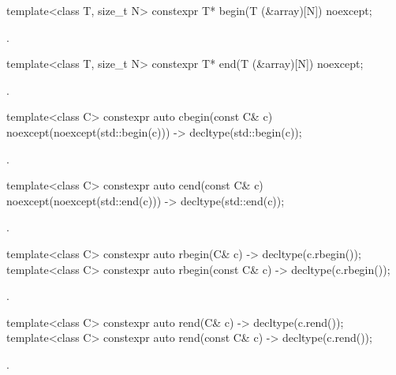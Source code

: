 %
\begin{itemdecl}
template<class T, size_t N> constexpr T* begin(T (&array)[N]) noexcept;
\end{itemdecl}

\begin{itemdescr}
\pnum
\returns
{}.
\end{itemdescr}

%
\begin{itemdecl}
template<class T, size_t N> constexpr T* end(T (&array)[N]) noexcept;
\end{itemdecl}

\begin{itemdescr}
\pnum
\returns
{}.
\end{itemdescr}

%
\begin{itemdecl}
template<class C> constexpr auto cbegin(const C& c) noexcept(noexcept(std::begin(c)))
  -> decltype(std::begin(c));
\end{itemdecl}
\begin{itemdescr}
\pnum
\returns
{}.
\end{itemdescr}

%
\begin{itemdecl}
template<class C> constexpr auto cend(const C& c) noexcept(noexcept(std::end(c)))
  -> decltype(std::end(c));
\end{itemdecl}
\begin{itemdescr}
\pnum
\returns
{}.
\end{itemdescr}

%
\begin{itemdecl}
template<class C> constexpr auto rbegin(C& c) -> decltype(c.rbegin());
template<class C> constexpr auto rbegin(const C& c) -> decltype(c.rbegin());
\end{itemdecl}
\begin{itemdescr}
\pnum
\returns
{}.
\end{itemdescr}

%
\begin{itemdecl}
template<class C> constexpr auto rend(C& c) -> decltype(c.rend());
template<class C> constexpr auto rend(const C& c) -> decltype(c.rend());
\end{itemdecl}
\begin{itemdescr}
\pnum
\returns
{}.
\end{itemdescr}

